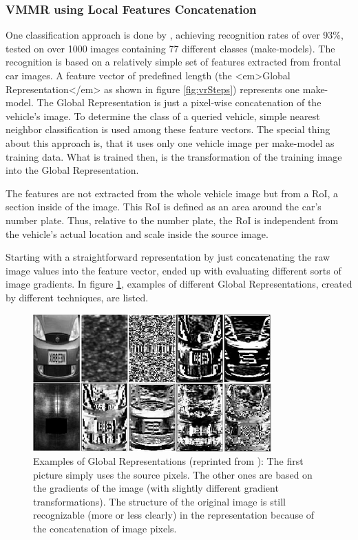 \subsubsection{VMMR using Local Features Concatenation}
One classification approach is done by \citeauthor{petrovic2004analysis} \cite{petrovic2004analysis}, achieving recognition rates of over 93\%, tested on over 1000 images containing 77 different classes (make-models). The recognition is based on a relatively simple set of features extracted from frontal car images. A feature vector of predefined length (the <em>Global Representation</em> as shown in figure \ref{fig:vrSteps}) represents one make-model. The Global Representation is just a pixel-wise concatenation of the vehicle's image. To determine the class of a queried vehicle, simple nearest neighbor classification is used among these feature vectors. The special thing about this approach is, that it uses only one vehicle image per make-model as training data. What is trained then, is the transformation of the training image into the Global Representation.

The features are not extracted from the whole vehicle image but from a RoI, a section inside of the image. This RoI is defined as an area around the car's number plate. Thus, relative to the number plate, the RoI is independent from the vehicle's actual location and scale inside the source image.

Starting with a straightforward representation by just concatenating the raw image values into the feature vector, \citeauthor{petrovic2004analysis} ended up with evaluating different sorts of image gradients. In figure \ref{fig:vmmrConcatenation}, examples of different Global Representations, created by different techniques, are listed.

\begin{figure}[bth]
  \centering
        \includegraphics[width=.65\linewidth]{gfx/vmmr_concatenation_reprint}
        \caption{Examples of Global Representations (reprinted from \citep{petrovic2004analysis}): The first picture simply uses the source pixels. The other ones are based on the gradients of the image (with slightly different gradient transformations). The structure of the original image is still recognizable (more or less clearly) in the representation because of the concatenation of image pixels.}
        \label{fig:vmmrConcatenation}
\end{figure}

